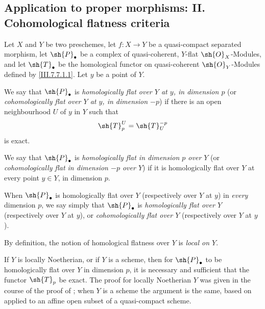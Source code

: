 \subsection{Application to proper morphisms: II. Cohomological flatness criteria}
\label{subsection:III.7.8}
\label{III.7.8}

\begin{definition}[7.8.1]
\label{III.7.8.1}
Let $X$ and $Y$ be two preschemes, let $f:X\to Y$ be a
quasi-compact separated morphism, let $\sh{P}_\bullet$ be a
complex of quasi-coherent, $Y$-flat $\sh{O}_X$-Modules, and
let $\sh{T}_\bullet$ be the homological functor on
quasi-coherent $\sh{O}_Y$-Modules defined by
\eqref{III.7.7.1.1}.  Let $y$ be a point of $Y$.

We say that $\sh{P}_\bullet$ is \emph{homologically flat over
$Y$ at $y$, in dimension $p$} (or \emph{cohomologically flat
over $Y$ at $y$, in dimension $-p$}) if there is an open
neighbourhood $U$ of $y$ in $Y$ such that
\[
  \sh{T}_p^U=\sh{T}^{-p}_U
\]
is exact.

We say that $\sh{P}_\bullet$ is \emph{homologically flat in
dimension $p$ over $Y$} (or \emph{cohomologically flat in
dimension $-p$ over $Y$}) if it is homologically flat over
$Y$ at every point $y\in Y$, in dimension $p$.

When $\sh{P}_\bullet$ is homologically flat over $Y$
(respectively over $Y$ at $y$) in \emph{every} dimension
$p$, we say simply that $\sh{P}_\bullet$ is
\emph{homologically flat over $Y$} (respectively over $Y$ at
$y$), or \emph{cohomologically flat over $Y$} (respectively
over $Y$ at $y$).
\end{definition}

\begin{env}[7.8.2]
\label{III.7.8.2}
By definition, the notion of homological flatness over $Y$
is \emph{local on $Y$}.

If $Y$ is locally Noetherian, or if $Y$ is a scheme, then
for $\sh{P}_\bullet$ to be homologically flat over $Y$ in
dimension $p$, it is necessary and sufficient that the
functor $\sh{T}_p$ be exact.  The proof for locally
Noetherian $Y$ was given in the course of the proof of
; when $Y$ is a scheme the argument is the
same, based on  applied to an affine open
subset of a quasi-compact scheme.
\end{env}

